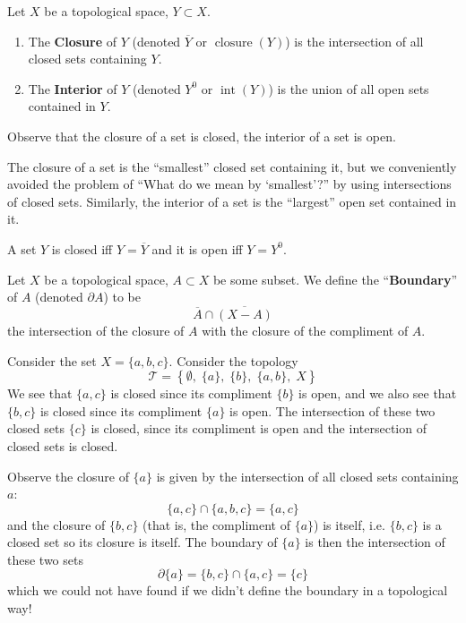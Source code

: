 \begin{defn}
Let $X$ be a topological space, $Y\subset X$.
\begin{enumerate}
\item The \textbf{Closure} of $Y$ (denoted $\overline{Y}$ or
  $\operatorname{closure}(Y)$) is the intersection of all closed sets
  containing $Y$.
\item The \textbf{Interior} of $Y$ (denoted $Y^0$ or
  $\operatorname{int}(Y)$) is the union of all open sets contained in
  $Y$.
\end{enumerate}
\end{defn}
\begin{rmk}
Observe that the closure of a set is closed, the interior of a set is open.
\end{rmk}
\begin{rmk}
The closure of a set is the ``smallest'' closed set containing it, but
we conveniently avoided the problem of ``What do we mean by
`smallest'?'' by using intersections of closed sets. Similarly, the
interior of a set is the ``largest'' open set contained in it.
\end{rmk}
\begin{rmk}
A set $Y$ is closed iff $Y=\overline{Y}$ and it is open iff $Y=Y^0$.
\end{rmk}
\begin{defn}
Let $X$ be a topological space, $A\subset X$ be some subset. We define
the ``\textbf{Boundary}'' of $A$ (denoted $\partial A$) to be
\begin{equation}
\overline{A}\cap\overline{(X-A)}
\end{equation}
the intersection of the closure of $A$ with the closure of the
compliment of $A$.
\end{defn}
\begin{ex}
Consider the set $X=\{a,b,c\}$. Consider the topology
\begin{equation}
\mathcal{T} = \left\{\emptyset,\;\{a\},\; \{b\},\; \{a,b\},\; X\right\}
\end{equation}
We see that $\{a,c\}$ is closed since its compliment $\{b\}$ is open,
and we also see that $\{b,c\}$ is closed since its compliment $\{a\}$
is open. The intersection of these two closed sets $\{c\}$ is closed,
since its compliment is open and the intersection of closed sets is
closed.

Observe the closure of $\{a\}$ is given by the intersection of
all closed sets containing $a$:
\begin{equation}
\{a,c\}\cap\{a,b,c\}=\{a,c\}
\end{equation}
and the closure of $\{b,c\}$ (that is, the compliment of $\{a\}$) is
itself, i.e. $\{b,c\}$ is a closed set so its closure is itself. The
boundary of $\{a\}$ is then the intersection of these two sets
\begin{equation}
\partial \{a\} = \{b,c\}\cap\{a,c\} = \{c\}
\end{equation}
which we could not have found if we didn't define the boundary in a
topological way!
\end{ex}
